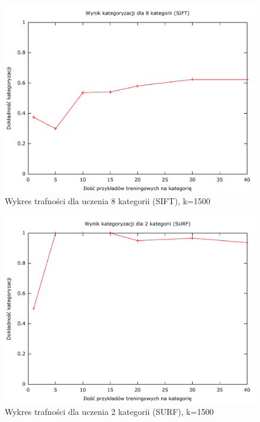 \begin{figure}[h]
	\centering
	\includegraphics[scale=0.8]{graphics/04_interpretacja_wynikow/result-sift-8.pdf}
	\caption{ Wykres trafności dla uczenia 8 kategorii (SIFT), k=1500 }
	\label{fig:result-sift-8}
\end{figure}

\begin{figure}[h]
	\centering
	\includegraphics[scale=0.8]{graphics/04_interpretacja_wynikow/result-surf-2.pdf}
	\caption{ Wykres trafności dla uczenia 2 kategorii (SURF), k=1500 }
	\label{fig:result-surf-2}
\end{figure}

